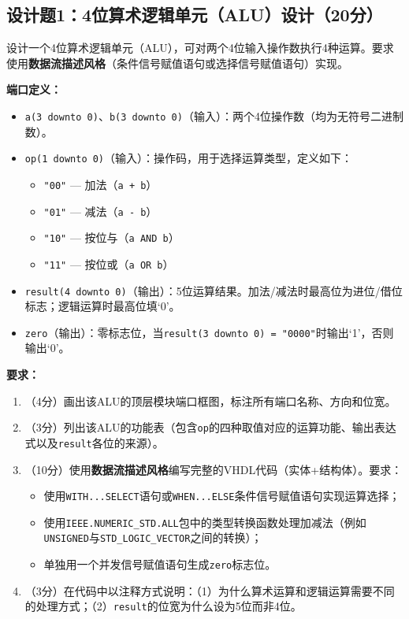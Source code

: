 \subsection*{设计题1：4位算术逻辑单元（ALU）设计（20分）}

设计一个4位算术逻辑单元（ALU），可对两个4位输入操作数执行4种运算。要求使用\textbf{数据流描述风格}（条件信号赋值语句或选择信号赋值语句）实现。

\vspace{0.3cm}

\textbf{端口定义：}
\begin{itemize}
  \item \texttt{a(3~downto~0)}、\texttt{b(3~downto~0)}（输入）：两个4位操作数（均为无符号二进制数）。
  \item \texttt{op(1~downto~0)}（输入）：操作码，用于选择运算类型，定义如下：
  \begin{itemize}
    \item \texttt{"00"} --- 加法（\texttt{a + b}）
    \item \texttt{"01"} --- 减法（\texttt{a - b}）
    \item \texttt{"10"} --- 按位与（\texttt{a AND b}）
    \item \texttt{"11"} --- 按位或（\texttt{a OR b}）
  \end{itemize}
  \item \texttt{result(4~downto~0)}（输出）：5位运算结果。加法/减法时最高位为进位/借位标志；逻辑运算时最高位填`0'。
  \item \texttt{zero}（输出）：零标志位，当\texttt{result(3~downto~0) = "0000"}时输出`1'，否则输出`0'。
\end{itemize}

\vspace{0.3cm}

\textbf{要求：}
\begin{enumerate}[label=(\arabic*)]
  \item （4分）画出该ALU的顶层模块端口框图，标注所有端口名称、方向和位宽。
  \item （3分）列出该ALU的功能表（包含\texttt{op}的四种取值对应的运算功能、输出表达式以及\texttt{result}各位的来源）。
  \item （10分）使用\textbf{数据流描述风格}编写完整的VHDL代码（实体+结构体）。要求：
  \begin{itemize}
    \item 使用\texttt{WITH...SELECT}语句或\texttt{WHEN...ELSE}条件信号赋值语句实现运算选择；
    \item 使用\texttt{IEEE.NUMERIC\_STD.ALL}包中的类型转换函数处理加减法（例如\texttt{UNSIGNED}与\texttt{STD\_LOGIC\_VECTOR}之间的转换）；
    \item 单独用一个并发信号赋值语句生成\texttt{zero}标志位。
  \end{itemize}
  \item （3分）在代码中以注释方式说明：（1）为什么算术运算和逻辑运算需要不同的处理方式；（2）\texttt{result}的位宽为什么设为5位而非4位。
\end{enumerate}

